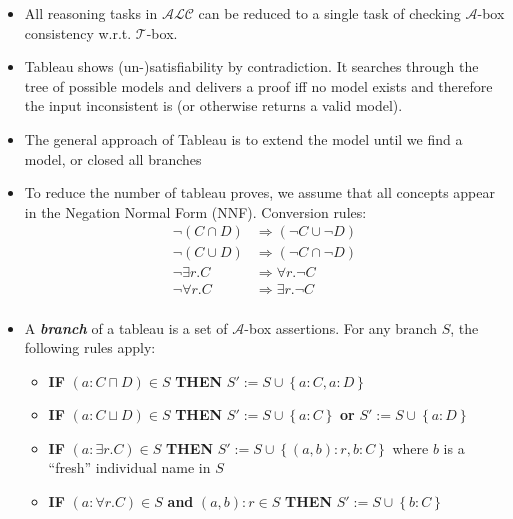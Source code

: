 \begin{itemize}
	\item All reasoning tasks in $\mathcal{ALC}$ can be reduced to a single task of checking
	$\mathcal{A}$-box consistency w.r.t. $\mathcal{T}$-box.
	\item Tableau shows (un-)satisfiability by contradiction. It searches through the tree of possible models and delivers a proof iff no model exists and therefore the input inconsistent is (or otherwise returns a valid model).
	\item The general approach of Tableau is to extend the model until we find a model, or closed all branches
	\item To reduce the number of tableau proves, we assume that all concepts appear in the Negation Normal Form (NNF). Conversion rules:
	\begin{equation*}
		\begin{split}
			\lnot\left(C \cap D\right) & \Rightarrow \left(\lnot C \cup \lnot D\right)\\
			\lnot\left(C \cup D\right) & \Rightarrow \left(\lnot C \cap \lnot D\right)\\
			\lnot\exists r.C & \Rightarrow \forall r.\lnot C\\
			\lnot\forall r.C & \Rightarrow \exists r.\lnot C\\
		\end{split}
	\end{equation*}
	\item A \textit{\textbf{branch}} of a tableau is a set of $\mathcal{A}$-box assertions. For any branch $S$, the following rules apply:
	\begin{itemize}
		\item \textbf{IF} $(a:C\sqcap D)\in S$ \textbf{THEN} $S' := S \cup \left\{a:C, a:D\right\}$
		\item \textbf{IF} $(a:C\sqcup D)\in S$ \textbf{THEN} $S' := S \cup \left\{a:C\right\}$ \textbf{or} $S' := S \cup \left\{a:D\right\}$
		\item \textbf{IF} $(a:\exists r.C)\in S$ \textbf{THEN} $S' := S \cup \left\{(a,b):r, b:C\right\}$ where $b$ is a ``fresh'' individual name in $S$
		\item \textbf{IF} $(a:\forall r.C)\in S$ \textbf{and} $(a,b):r \in S$ \textbf{THEN} $S' := S \cup \left\{b:C\right\}$

\end{itemize}
\end{itemize}

